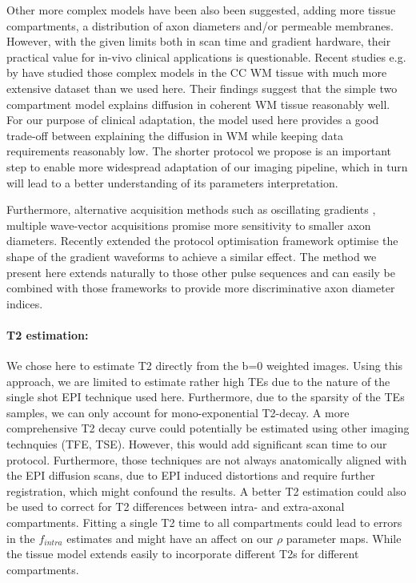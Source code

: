 Other more complex models have been also been suggested, adding more tissue compartments, a distribution of axon diameters and/or permeable membranes. However, with the given limits both in scan time and gradient hardware, their practical value for in-vivo clinical applications is questionable. Recent studies e.g. by \citet{Panagiotaki:2011; Uran:2012} have studied those complex models in the CC WM tissue with much more extensive dataset than we used here. Their findings suggest that the simple two compartment model explains diffusion in coherent WM tissue reasonably well. For our purpose of clinical adaptation, the model used here provides a good trade-off between explaining the diffusion in WM while keeping data requirements reasonably low. The shorter protocol we propose is an important step to enable more widespread adaptation of our imaging pipeline, which in turn will lead to a better understanding of its parameters interpretation.


Furthermore, alternative acquisition methods such as oscillating gradients \citep{Does, Siow}, multiple wave-vector acquisitions \citep{Koch,Orzaslan} promise more sensitivity to smaller axon diameters. Recently \citet{Drobnjak:2009} extended the protocol optimisation framework optimise the shape of the gradient waveforms to achieve a similar effect. The method we present here extends naturally to those other pulse sequences and can easily be combined with those frameworks to provide more discriminative axon diameter indices.

\paragraph{T2 estimation: } We chose here to estimate T2 directly from the b=0 weighted images. Using this approach, we are limited to estimate rather high \glspl{TE} due to the nature of the single shot EPI technique used here. Furthermore, due to the sparsity of the \glspl{TE} samples, we can only account for mono-exponential T2-decay. A more comprehensive T2 decay curve could potentially be estimated using other imaging technquies (TFE, TSE). However, this would add significant scan time to our protocol. Furthermore, those techniques are not always anatomically aligned with the EPI diffusion scans, due to EPI induced distortions and require further registration, which might confound the results. A better T2 estimation could also be used to correct for T2 differences between intra- and extra-axonal compartments. Fitting a single T2 time to all compartments could lead to errors in  the $f_{intra}$ estimates and might have an affect on our $\rho$ parameter maps. While the tissue model extends easily to incorporate different T2s for different compartments. 

